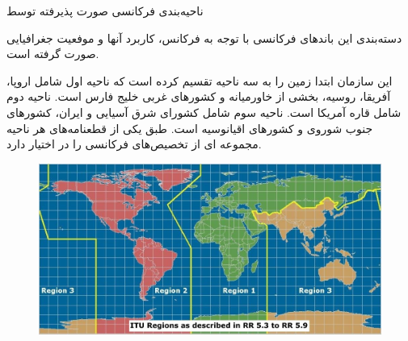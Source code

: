 \Problem
{ناحیه‌بندی فرکانسی صورت پذیرفته توسط }
{
دسته‌بندی این باندهای فرکانسی با توجه به فرکانس، کاربرد آنها و موفعیت جغرافیایی صورت گرفته است.

این سازمان ابتدا زمین را به سه ناحیه تقسیم کرده است که ناحیه اول شامل اروپا، آفریقا، روسیه، بخشی از خاورمیانه و کشورهای غربی خلیج فارس است.
ناحیه دوم شامل قاره آمریکا است.
ناحیه سوم شامل کشورای شرق آسیایی و ایران، کشورهای جنوب شوروی و کشورهای اقیانوسیه است.
طبق یکی از قطعنامه‌های
هر ناحیه مجموعه ای از تخصیص‌های فرکانسی را در اختیار دارد.

\begin{figure}[H]
    \includegraphics[width=12cm]{Images/ITU_Regions.jpg}
    \centering
    \caption{}
\end{figure}
}
